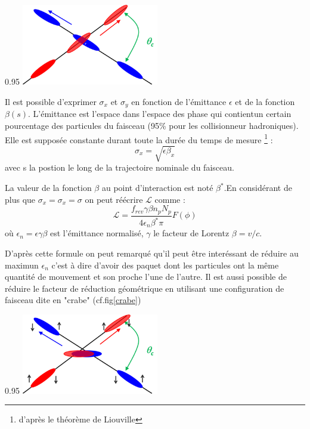 \begin{minipagewithmarginpars}[h]{0.95\textwidth}
\centering
\includegraphics[width=0.45\textwidth]{LHC/collision.png}
\label{collision}	
\end{minipagewithmarginpars}

Il est possible d'exprimer $\sigma_{x}$ et $\sigma_{y}$ en fonction de l'émittance $\epsilon$ et de la fonction $\beta(s)$. L'émittance est l'espace dans l'espace des phase qui contientun certain pourcentage des particules du faisceau (95\% pour les collisionneur hadroniques). Elle est supposée constante durant toute la durée du temps de mesure \footnote{d'après le théorème de Liouville} :
\begin{equation}
\sigma_{x}=\sqrt{\epsilon\beta_{x}}
\end{equation}
avec s la postion le long de la trajectoire nominale du faisceau.

La valeur de la fonction $\beta$ au point d'interaction est noté $\beta^{*}$.En considérant de plus que $\sigma_{x}=\sigma_{x}=\sigma$ on peut réécrire $\mathcal{L}$ comme :
\begin{equation}
\mathcal{L}=\frac{f_{rev}\gamma\beta n_{p}N_{p}}{4\epsilon_{n}\beta^{*}\pi} F(\phi)
\end{equation}
où $\epsilon_{n}=\epsilon\gamma\beta$ est l'émittance normalisé, $\gamma$ le facteur de Lorentz $\beta=v/c$.

D'après cette formule on peut remarqué qu'il peut être interéssant de réduire au maximun $\epsilon_{n}$ c'est à dire d'avoir des paquet dont les particules ont la même quantité de mouvement et son proche l'une de l'autre. Il est aussi possible de réduire le facteur de réduction géométrique en utilisant une configuration de faisceau dite en "crabe" (cf.fig\ref{crabe})

\begin{minipagewithmarginpars}[h]{0.95\textwidth}
\centering
\includegraphics[width=0.45\textwidth]{LHC/crab.png}
\label{crabe}	
\end{minipagewithmarginpars}

